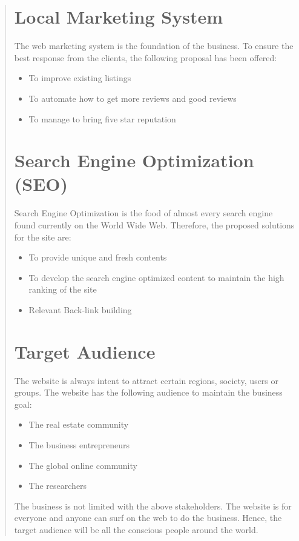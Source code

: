 \documentclass[35pt]{report}
\begin{document}
\begin{quote}
		\section{Local Marketing System}
		The web marketing system is the foundation of the business. To ensure the best response from the clients, the following proposal has been offered:
		\begin{itemize}
			\item To improve existing listings 
			\item To automate how to get more reviews and good reviews 
			\item To manage to bring five star reputation
		\end{itemize}

		\section{Search Engine Optimization (SEO)}
		Search Engine Optimization is the food of almost every search engine found currently 
on the World Wide Web. Therefore, the proposed solutions for the site are: 
		\begin{itemize}
			\item To provide unique and fresh contents
			\item To develop the search engine optimized content to maintain the high ranking of the site
			\item Relevant Back-link building
		\end{itemize}

		\section{Target Audience}
		The website is always intent to attract certain regions, society, users or groups. The website has the following audience to maintain the business goal:
		\begin{itemize}
			\item The real estate community
			\item The business entrepreneurs
			\item The global online community
			\item The researchers
		\end{itemize}	
		The business is not limited with the above stakeholders. The website is for everyone and anyone can surf on the web to do the business. Hence, the target audience will be all the conscious people around the world.   
\end{quote}
\clearpage
\end{document}
